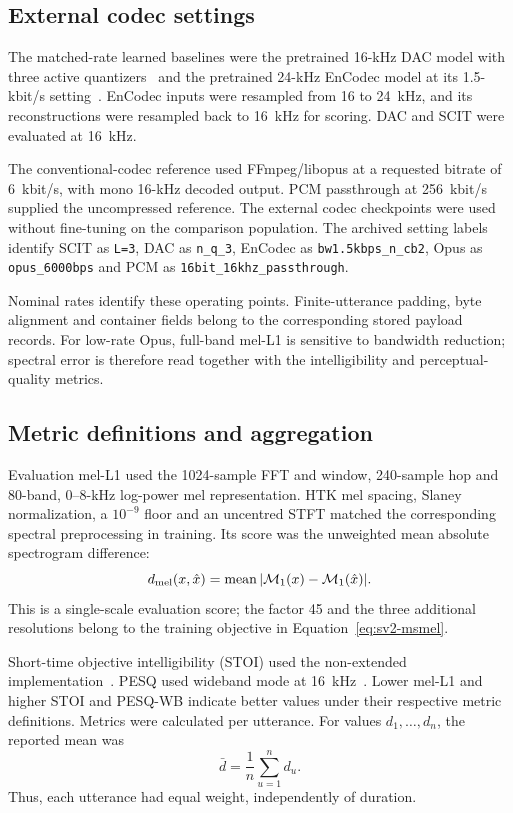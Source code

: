 \subsection{External codec settings}
The matched-rate learned baselines were the pretrained 16-kHz DAC model with three active quantizers~\cite{dac} and the pretrained 24-kHz EnCodec model at its 1.5-kbit/s setting~\cite{encodec}. EnCodec inputs were resampled from 16 to 24~kHz, and its reconstructions were resampled back to 16~kHz for scoring. DAC and SCIT were evaluated at 16~kHz.

The conventional-codec reference used FFmpeg/libopus at a requested bitrate of 6~kbit/s, with mono 16-kHz decoded output. PCM passthrough at 256~kbit/s supplied the uncompressed reference. The external codec checkpoints were used without fine-tuning on the comparison population. The archived setting labels identify SCIT as \texttt{L=3}, DAC as \texttt{n\_q\_3}, EnCodec as \texttt{bw1.5kbps\_n\_cb2}, Opus as \texttt{opus\_6000bps} and PCM as \texttt{16bit\_16khz\_passthrough}.

Nominal rates identify these operating points. Finite-utterance padding, byte alignment and container fields belong to the corresponding stored payload records. For low-rate Opus, full-band mel-L1 is sensitive to bandwidth reduction; spectral error is therefore read together with the intelligibility and perceptual-quality metrics.

\subsection{Metric definitions and aggregation}
Evaluation mel-L1 used the 1024-sample FFT and window, 240-sample hop and 80-band, 0--8-kHz log-power mel representation. HTK mel spacing, Slaney normalization, a $10^{-9}$ floor and an uncentred STFT matched the corresponding spectral preprocessing in training. Its score was the unweighted mean absolute spectrogram difference:
\begin{equation}
 d_{\rm mel}(x,\hat x)
 =\operatorname{mean}|\mathcal M_1(x)-\mathcal M_1(\hat x)|.
 \label{eq:sv2-evalmel}
\end{equation}
This is a single-scale evaluation score; the factor 45 and the three additional resolutions belong to the training objective in Equation~\ref{eq:sv2-msmel}.

Short-time objective intelligibility (STOI) used the non-extended implementation~\cite{stoi}. PESQ used wideband mode at 16~kHz~\cite{pesq}. Lower mel-L1 and higher STOI and PESQ-WB indicate better values under their respective metric definitions. Metrics were calculated per utterance. For values $d_1,\ldots,d_n$, the reported mean was
\begin{equation}
 \bar d=\frac{1}{n}\sum_{u=1}^{n}d_u.
 \label{eq:sv2-mean}
\end{equation}
Thus, each utterance had equal weight, independently of duration.

